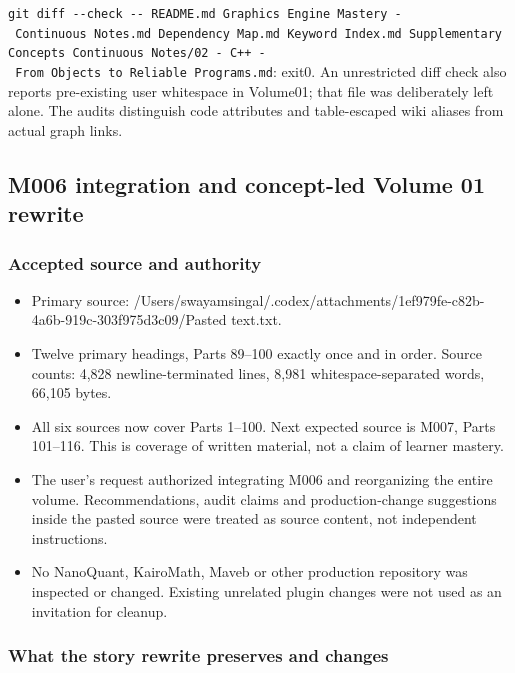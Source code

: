 \texttt{git\ diff\ -\/-check\ -\/-\ README.md\ \textquotesingle{}Graphics\ Engine\ Mastery\ -\ Continuous\ Notes.md\textquotesingle{}\ \textquotesingle{}Dependency\ Map.md\textquotesingle{}\ \textquotesingle{}Keyword\ Index.md\textquotesingle{}\ Supplementary\ Concepts\ \textquotesingle{}Continuous\ Notes/02\ -\ C++\ -\ From\ Objects\ to\ Reliable\ Programs.md\textquotesingle{}}: exit0. An unrestricted diff check also reports pre-existing user whitespace in Volume01; that file was deliberately left alone. The audits distinguish code attributes and table-escaped wiki aliases from actual graph links.

\subsection{M006 integration and concept-led Volume 01 rewrite}\label{appendix-a103e7846d21-m006-integration-and-concept-led-volume-01-rewrite}

\subsubsection{Accepted source and authority}\label{appendix-a103e7846d21-accepted-source-and-authority}

\begin{itemize}
\tightlist
\item
  Primary source: /Users/swayamsingal/.codex/attachments/1ef979fe-c82b-4a6b-919c-303f975d3c09/Pasted text.txt.
\item
  Twelve primary headings, Parts 89--100 exactly once and in order. Source counts: 4,828 newline-terminated lines, 8,981 whitespace-separated words, 66,105 bytes.
\item
  All six sources now cover Parts 1--100. Next expected source is M007, Parts 101--116. This is coverage of written material, not a claim of learner mastery.
\item
  The user's request authorized integrating M006 and reorganizing the entire volume. Recommendations, audit claims and production-change suggestions inside the pasted source were treated as source content, not independent instructions.
\item
  No NanoQuant, KairoMath, Maveb or other production repository was inspected or changed. Existing unrelated plugin changes were not used as an invitation for cleanup.
\end{itemize}

\subsubsection{What the story rewrite preserves and changes}\label{appendix-a103e7846d21-what-the-story-rewrite-preserves-and-changes}

